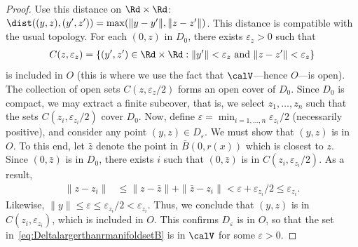 \begin{proof}
	Use this distance on $\Rd \times \Rd$: $\dist((y, z), (y', z')) = \max(\|y - y'\|, \|z - z'\|)$. This distance is compatible with the usual topology. For each $(0, z)$ in $D_0$, there exists $\varepsilon_z > 0$ such that
	\begin{align*}
	C(z, \varepsilon_z) = \left\{ (y', z') \in \Rd \times \Rd : \|y'\| < \varepsilon_z \textrm{ and } \|z - z'\| < \varepsilon_z \right\}
	\end{align*}
	is included in $O$ (this is where we use the fact that $\calV$---hence $O$---is open). The collection of open sets $C(z, \varepsilon_z/2)$ forms an open cover of $D_0$. Since $D_0$ is compact, we may extract a finite subcover, that is, we select $z_1, \ldots, z_n$ such that the sets $C(z_i, \varepsilon_{z_i}/2)$ cover $D_0$. Now, define $\varepsilon = \min_{i = 1, \ldots, n} \varepsilon_{z_i}/2$ (necessarily positive), and consider any point $(y, z) \in D_\varepsilon$. We must show that $(y, z)$ is in $O$. To this end, let $\bar z$ denote the point in $\bar B(0, r(x))$ which is closest to $z$. Since $(0, \bar z)$ is in $D_0$, there exists $i$ such that $(0, \bar z)$ is in $C(z_i, \varepsilon_{z_i}/2)$. As a result,
	\begin{align*}
	\|z - z_i\| & \leq \|z - \bar z\| + \|\bar z - z_i\| < \varepsilon + \varepsilon_{z_i}/2 \leq \varepsilon_{z_i}.
	\end{align*}
	Likewise, $\|y\| \leq \varepsilon \leq \varepsilon_{z_i}/2 < \varepsilon_{z_i}$. Thus, we conclude that $(y, z)$ is in $C(z_i, \varepsilon_{z_i})$, which is included in $O$. This confirms $D_\varepsilon$ is in $O$, so that the set in~\eqref{eq:DeltalargerthanrmanifoldsetB} is in $\calV$ for some $\varepsilon > 0$.
\end{proof}


